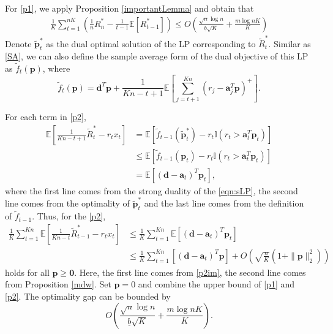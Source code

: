 \documentclass{article} %
\begin{document}
\begin{APPENDICES}
                For \eqref{p1}, we apply Proposition \ref{importantLemma} and obtain that
                \begin{align*}
                    \frac{1}{K}\sum\limits_{t=1}^{nK}\left(\frac{1}{n}R_n^*-\frac{1}{t-1}\mathbb{E}[R_{t-1}^*]\right)
                    \leq
                    O\left(\frac{\sqrt{n}\log n}{\underline{b}\sqrt{K}}  +\frac{m\log nK}{K}\right)
                \end{align*}
                Denote $\tilde{\bm{p}}_{t}^*$ as the dual optimal solution of the LP corresponding to $\tilde{R}^{*}_{t}$. Similar as \eqref{SA}, we can also define the sample average form of the dual objective of this LP as $\tilde{f}_{t}(\bm{p})$, where
                $$
                    \tilde{f}_{t}(\bm{p})=\bm{d}^T\bm{p}+\frac{1}{Kn-t+1}\mathbb{E}\left[\sum_{j=t+1}^{Kn} (r_j-\bm{a}_j^T\bm{p})^{+}\right].
                $$
                
                For each term in \eqref{p2}, 
                \begin{align}
                    \label{p2im}
                    \mathbb{E}\left[\frac{1}{Kn-t+1}\tilde{R}_{t}^*-r_{t}x_{t}\right]
                    &=
                    \mathbb{E}\left[\tilde{f}_{t-1}(\tilde{\bm{p}}^*_{t}) - r_{t}\mathbb{I}(r_{t}>\bm{a}_{t}^T\bm{p}_t)\right]\nonumber\\
                    &\leq
                    \mathbb{E}\left[\tilde{f}_{t-1}({\bm{p}}_{t}) - r_{t}\mathbb{I}(r_{t}>\bm{a}_{t}^T\bm{p}_t)\right]\nonumber\\
                    &=
                    \mathbb{E}\left[(\bm{d}-\bm{a}_t)^T\bm{p}_t\right],
                \end{align}
                where the first line comes from the strong duality of the \eqref{eqn:sLP}, the second line comes from the optimality of $\tilde{\bm{p}}_t^*$ and the last line comes from the definition of $\tilde{f}_{t-1}$. Thus, for the \eqref{p2},
                \begin{align*}
                    \frac{1}{K}\sum\limits_{t=1}^{Kn}\mathbb{E}\left[\frac{1}{Kn-t}\tilde{R}_{t-1}^*-r_{t}x_{t}\right]
                    &\leq
                    \frac{1}{K}\sum\limits_{t=1}^{Kn}\mathbb{E}\left[(\bm{d}-\bm{a}_t)^T\bm{p}_t\right]\\
                    &\leq
                    \frac{1}{K}\sum\limits_{t=1}^{Kn}\left[(\bm{d}-\bm{a}_t)^T\bm{p}\right]+O\left(\sqrt{\frac{n}{K}}(1+\|\bm{p}\|_2^2)\right)
                \end{align*}
                holds for all $\bm{p}\geq\bm{0}$. Here, the first line comes from \eqref{p2im}, the second line comes from Proposition \ref{mdw}. Set $\bm{p}=0$ and combine the upper bound of \eqref{p1} and \eqref{p2}. The optimality gap can be bounded by
                $$
                    O\left(\frac{\sqrt{n}\log n}{\underline{b}\sqrt{K}}  +\frac{m\log nK}{K}\right).
                $$
                

\end{APPENDICES}
\end{document}
